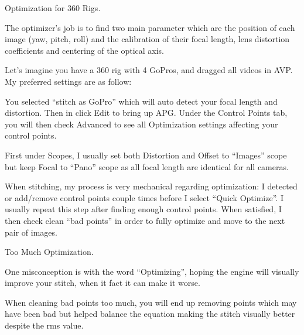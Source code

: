 \begin{fullwidth}
{\large Optimization for 360 Rigs. \par}

The optimizer’s job is to find two main parameter which are the position of each image (yaw, pitch, roll) and the calibration of their focal length, lens distortion coefficients and centering of the optical axis. 

Let’s imagine you have a 360 rig with 4 GoPros, and dragged all videos in AVP. My preferred settings are as follow:

You selected “stitch as GoPro” which will auto detect your focal length and distortion. Then in click Edit to bring up APG. Under the Control Points tab, you will then check Advanced to see all Optimization settings affecting your control points.

First under Scopes, I usually set both Distortion and Offset to “Images” scope but keep Focal to “Pano” scope as all focal length are identical for all cameras.

When stitching, my process is very mechanical regarding optimization: I detected or add/remove control points couple times before I select “Quick Optimize”. I usually repeat this step after finding enough control points. When satisfied, I then check clean “bad points” in order to fully optimize and move to the next pair of images.

{\large Too Much Optimization. \par}

One misconception is with the word “Optimizing”, hoping the engine will visually improve your stitch, when it fact it can make it worse.

When cleaning bad points too much, you will end up removing points which may have been bad but helped balance the equation making the stitch visually better despite the rms value.


\clearpage
\end{fullwidth}
